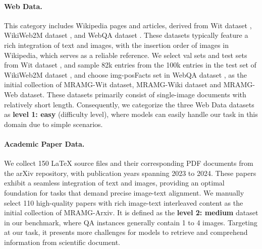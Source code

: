 \paragraph{Web Data.} This category includes Wikipedia pages and articles, derived from Wit dataset \citep{srinivasan2021wit}, WikiWeb2M dataset \citep{burns2023wikiweb2m}, and WebQA dataset \citep{chang2022webqa}. These datasets typically feature a rich integration of text and images, with the insertion order of images in Wikipedia, which serves as a reliable reference. We select val sets and test sets from Wit dataset \citep{srinivasan2021wit}, and sample 82k entries from the 100k entries in the test set of WikiWeb2M dataset \citep{burns2023wikiweb2m} , and choose img-posFacts set in WebQA dataset \citep{chang2022webqa}, as the initial collection of MRAMG-Wit dataset, MRAMG-Wiki dataset and MRAMG-Web dataset.
These datasets primarily consist of single-image documents with relatively short length. Consequently, we categorize the three Web Data datasets as \textbf{level 1: easy} (difficulty level), where models can easily handle our task in this domain due to simple scenarios.
\vspace{-1mm}
\paragraph{Academic Paper Data.} We collect 150 LaTeX source files and their corresponding PDF documents from the arXiv repository, with publication years spanning 2023 to 2024. These papers exhibit a seamless integration of text and images, providing an optimal foundation for tasks that demand precise image-text alignment. We manually select 110 high-quality papers with rich image-text interleaved content as the initial collection of MRAMG-Arxiv. It is defined as the \textbf{level 2: medium} dataset in our benchmark, where QA instances generally contain 1 to 4 images. Targeting at our task, it presents more challenges for models to retrieve and comprehend information from scientific document.
\vspace{-1mm}
